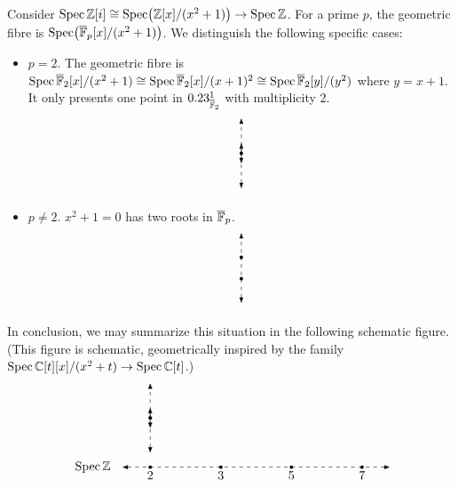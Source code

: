 \begin{example}
    \label{ex:Z[i]}
    Consider $\operatorname{Spec}\mathbb{Z}[i] \cong \operatorname{Spec} \bigl(\mathbb{Z}[x]/(x^2 + 1)\bigr) \to \operatorname{Spec} \mathbb{Z}$. For a prime $p$, the geometric fibre is $\operatorname{Spec} \bigl(\overline{\mathbb{F}}_p[x]/(x^2 + 1)\bigr)$. We distinguish the following specific cases:
    \begin{itemize}
        \item $p = 2$. The geometric fibre is $\operatorname{Spec}\overline{\mathbb{F}}_2[x]/(x^2 + 1) \cong \operatorname{Spec}\overline{\mathbb{F}}_2[x]/(x + 1)^2 \cong \operatorname{Spec}\overline{\mathbb{F}}_2[y]/(y^2)$ where $y = x + 1$. It only presents one point in $0.23^1_{\overline{\mathbb{F}}_2}$ with multiplicity $2$.
        \[
            \begin{tikzpicture}[>=Latex, scale=1]
                \draw[dashed, <->] (0,-1) -- (0,1);
            
                \fill (0,0) circle (1.5pt);
            
                \draw[->] (0,0) -- (0,0.3);
                \draw[->] (0,0) -- (0,-0.3);
            \end{tikzpicture}
        \]
        \item $p \neq 2$. $x^2 + 1 = 0$ has two roots in $\overline{\mathbb{F}}_p$.
        \[
            \begin{tikzpicture}[>=Latex, scale=1]
                \draw[dashed, <->] (0,-1) -- (0,1);
            
                \fill (0,0.3) circle (1.5pt);
                \fill (0,-0.3) circle (1.5pt);
            \end{tikzpicture}
        \]
    \end{itemize}
    In conclusion, we may summarize this situation in the following schematic figure. (This figure is schematic, geometrically inspired by the family $\operatorname{Spec} \mathbb{C}[t][x]/(x^2 + t) \to \operatorname{Spec}\mathbb{C}[t]$.)
    \[
        \begin{tikzpicture}[>=Latex, scale=1]
        
            \draw[dashed, <->] (-0.8,0) -- (6.8,0);
            \node[left] at (-1.0,0) {$\Spec \Z$};
        
            \foreach \x/\p in {0/2, 2/3, 4/5, 6/7} {
                \fill (\x,0) circle (1.4pt);
                \node[below] at (\x,0) {$\p$};
            }
        
            \draw[dashed, <->] (0,0.4) -- (0,2.4);
            \fill (0,1.4) circle (1.5pt);
            \draw[->] (0,1.4) -- (0,1.7);
            \draw[->] (0,1.4) -- (0,1.1);
        

\end{tikzpicture}\]
\end{example}
